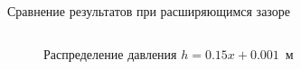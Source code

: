 \documentclass[ignoreonframetext,unicode]{beamer}
\begin{document}
\begin{frame}{Сравнение результатов при расширяющимся зазоре}
	\begin{columns}
		\begin{figure}[!htbp]
			\caption{Распределение давления $h = 0.15 x + 0.001$~м}
			\label{res_pos}
		\end{figure}


\end{columns}
\end{frame}
\end{document}
